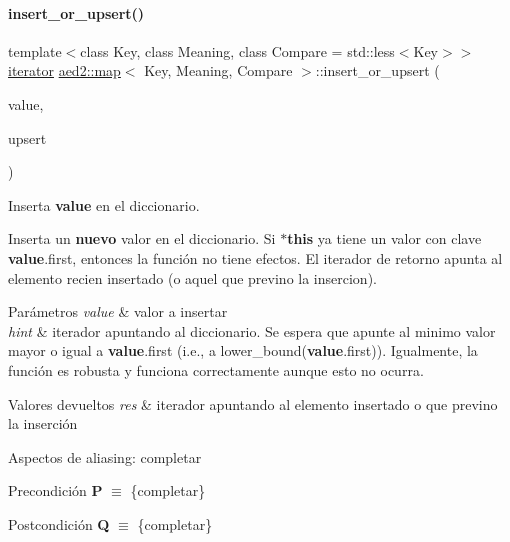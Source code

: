 \paragraph{\texorpdfstring{insert\+\_\+or\+\_\+upsert()}{insert\_or\_upsert()}}
{\footnotesize\ttfamily template$<$class Key, class Meaning, class Compare = std\+::less$<$\+Key$>$$>$ \\
\hyperlink{classaed2_1_1map_1_1iterator}{iterator} \hyperlink{classaed2_1_1map}{aed2\+::map}$<$ Key, Meaning, Compare $>$\+::insert\+\_\+or\+\_\+upsert (\begin{DoxyParamCaption}\item[{const \hyperlink{classaed2_1_1map_a719db98e0ff9a837610f76be33264680_a719db98e0ff9a837610f76be33264680}{value\+\_\+type} \&}]{value,  }\item[{bool}]{upsert }\end{DoxyParamCaption})\hspace{0.3cm}{\ttfamily [inline]}}



Inserta {\bfseries value} en el diccionario. 

Inserta un {\bfseries nuevo} valor en el diccionario. Si {\bfseries $\ast$this} ya tiene un valor con clave {\bfseries value}.first, entonces la función no tiene efectos. El iterador de retorno apunta al elemento recien insertado (o aquel que previno la insercion).


\begin{DoxyParams}{Parámetros}
{\em value} & valor a insertar \\
\hline
{\em hint} & iterador apuntando al diccionario. Se espera que apunte al minimo valor mayor o igual a {\bfseries value}.first (i.\+e., a lower\+\_\+bound({\bfseries value}.first)). Igualmente, la función es robusta y funciona correctamente aunque esto no ocurra. \\
\hline
\end{DoxyParams}

\begin{DoxyRetVals}{Valores devueltos}
{\em res} & iterador apuntando al elemento insertado o que previno la inserción\\
\hline
\end{DoxyRetVals}
\begin{DoxyParagraph}{Aspectos de aliasing\+:}
completar
\end{DoxyParagraph}
\begin{DoxyPrecond}{Precondición}
{\bfseries P} $\equiv$ \{completar\} 
\end{DoxyPrecond}
\begin{DoxyPostcond}{Postcondición}
{\bfseries Q} $\equiv$ \{completar\}
\end{DoxyPostcond}

